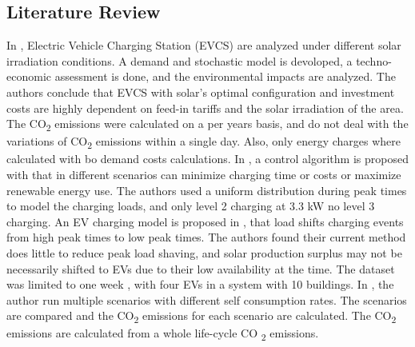 \documentclass[conference]{IEEEtran}
\begin{document}
  	\subsection{Literature Review}
  	In  \cite{himabindu2021analysis},   Electric Vehicle Charging Station (EVCS) are analyzed under different solar irradiation conditions.  A demand and stochastic model is devoloped, a techno-economic assessment is done, and the environmental impacts are analyzed.  The authors conclude that EVCS with solar's optimal configuration  and investment costs are highly dependent on feed-in tariffs and  the solar irradiation of the area. The  CO\textsubscript{2} emissions were calculated on a per years basis, and do not deal with the variations of  CO\textsubscript{2} emissions within a single day.  Also, only energy charges where calculated with bo demand costs calculations.  In ,  a control algorithm is proposed with that in different scenarios can minimize charging time or costs or maximize renewable energy use. The authors used a uniform distribution during peak times  to model the charging loads, and only level 2 charging at 3.3 kW no level 3 charging. An EV charging model is proposed in \cite{purvins2018electric},  that load shifts charging events from high peak times to low peak times.  The authors found their current method does little to reduce peak load shaving, and solar production surplus may not be necessarily shifted to EVs due to their low availability at the time.  The dataset was limited to one week , with four EVs in a system with 10 buildings.  In \cite{Khemir}, the author run multiple scenarios with different self consumption rates. The scenarios are compared and the CO\textsubscript{2} emissions for each scenario are calculated. The CO\textsubscript{2} emissions are calculated from a whole life-cycle CO \textsubscript{2}  emissions. 
  	
\end{document}
